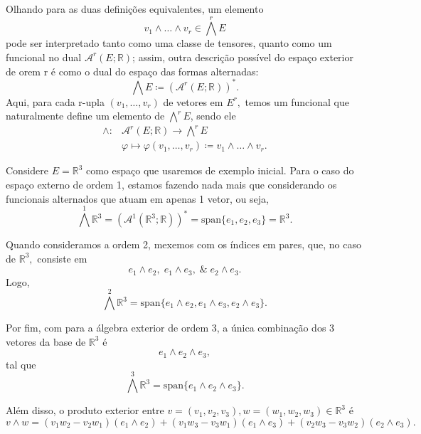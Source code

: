 \documentclass[../differential_forms.tex]{subfiles}
\begin{document}
Olhando para as duas definições equivalentes, um elemento
\[
	v_1\wedge\dotsc \wedge v_r\in \bigwedge^{r}E
\]
pode ser interpretado tanto como uma classe de tensores, quanto como um funcional no dual \(\mathcal{A}^{r}(E; \mathbb{R})\); assim, outra descrição
possível do espaço exterior de orem r é como o dual do espaço das formas alternadas:
\[
	\bigwedge E \coloneqq (\mathcal{A}^{r}(E; \mathbb{R}))^{*}.
\]
Aqui, para cada r-upla \((v_1, \dotsc , v_r)\) de vetores em \(E^{r},\) temos um funcional que naturalmente define um elemento de \(\bigwedge^{r}E\), sendo ele
\begin{align*}
	\wedge : & \mathcal{A}^{r}(E; \mathbb{R})\rightarrow \bigwedge^{r}E                              \\
	         & \varphi \longmapsto \varphi (v_1, \dotsc , v_r)\coloneqq v_1\wedge \dotsc \wedge v_r.
\end{align*}
\begin{example}
	Considere \(E = \mathbb{R}^{3}\) como espaço que usaremos de exemplo inicial. Para o caso do espaço externo de ordem 1, estamos fazendo nada mais que considerando
	os funcionais alternados que atuam em apenas 1 vetor, ou seja,
	\[
		\bigwedge^{1}\mathbb{R}^{3} = (\mathcal{A}^{1}(\mathbb{R}^{3}; \mathbb{R}))^* = \mathrm{span}\{e_1, e_2, e_3\} = \mathbb{R}^{3}.
	\]

	Quando consideramos a ordem 2, mexemos com os índices em pares, que, no caso de \(\mathbb{R}^{3},\) consiste em
	\[
		e_1 \wedge e_2,\; e_1 \wedge e_3,\;\&\; e_{2}\wedge e_3.
	\]
	Logo,
	\[
		\bigwedge^{2}\mathbb{R}^{3} = \mathrm{span}\{e_1\wedge e_2, e_1\wedge e_3, e_2\wedge e_3\}.
	\]

	Por fim, com para a álgebra exterior de ordem 3, a única combinação dos 3 vetores da base de \(\mathbb{R}^{3}\) é
	\[
		e_1 \wedge e_2 \wedge e_3,
	\]
	tal que
	\[
		\bigwedge^{3}\mathbb{R}^{3} = \mathrm{span}\{e_1 \wedge e_2\wedge e_3\}.
	\]

	Além disso, o produto exterior entre \(v=(v_1, v_2, v_3), w=(w_1, w_2, w_3)\in \mathbb{R}^{3}\) é
	\[
		v\wedge w = (v_1w_2 - v_2w_1)(e_1\wedge e_2) + (v_1w_3 - v_3w_1)(e_1\wedge e_3) + (v_2w_3-v_3w_2)(e_2\wedge e_3).
	\]
\end{example}
\end{document}
